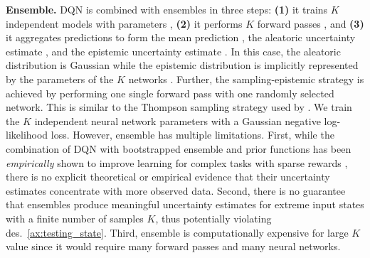 \textbf{Ensemble.} DQN is combined with ensembles \cite{ensembles} in three steps: \textbf{(1)} it trains $K$ independent models with parameters , \textbf{(2)} it performs $K$ forward passes , and \textbf{(3)} it aggregates predictions to form the mean prediction , the aleatoric uncertainty estimate , and the epistemic uncertainty estimate . In this case, the aleatoric distribution is Gaussian while the epistemic distribution is implicitly represented by the parameters of the $K$ networks . Further, the sampling-epistemic strategy is achieved by performing one single forward pass with one randomly selected network. This is similar to the Thompson sampling strategy used by \citet{bootstrapped-dqn}. We train the $K$ independent neural network parameters  with a Gaussian negative log-likelihood loss. However, ensemble has multiple limitations. First, while the combination of DQN with bootstrapped ensemble and prior functions has been \emph{empirically} shown to improve learning for complex tasks with sparse rewards \cite{bootstrapped-dqn, randomized-prior-functions}, there is no explicit theoretical or empirical evidence that their uncertainty estimates concentrate with more observed data. Second, there is no guarantee that ensembles produce meaningful uncertainty estimates for extreme input states with a finite number of samples $K$, thus potentially violating des.~\ref{ax:testing_state}. Third, ensemble is computationally expensive for large $K$ value since it would require many forward passes and many neural networks. 

